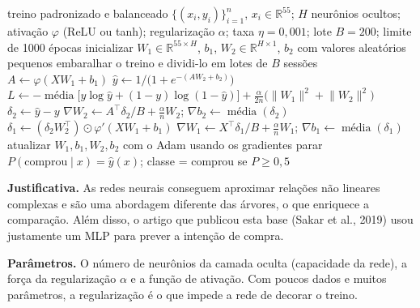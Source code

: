 \documentclass[11pt,a4paper]{article}
\begin{document}
\begin{algorithm}[H]
  \caption{Treino do MLP com uma camada oculta}
  \label{alg:mlp}
  \small
  \begin{algorithmic}[1]
    \Require treino padronizado e balanceado $\{(x_i, y_i)\}_{i=1}^{n}$, $x_i \in \mathbb{R}^{55}$; $H$ neurônios
             ocultos; ativação $\varphi$ (ReLU ou tanh); regularização $\alpha$; taxa $\eta = 0{,}001$; lote
             $B = 200$; limite de 1000 épocas
    \State inicializar $W_1 \in \mathbb{R}^{55 \times H}$, $b_1$, $W_2 \in \mathbb{R}^{H \times 1}$, $b_2$ com
           valores aleatórios pequenos
      \State embaralhar o treino e dividi-lo em lotes de $B$ sessões
        \State $A \gets \varphi(X W_1 + b_1)$ 
        \State $\hat{y} \gets 1 / \big(1 + e^{-(A W_2 + b_2)}\big)$ 
        \State $L \gets -\operatorname{média}\big[y \log \hat{y} + (1-y)\log(1-\hat{y})\big] +
               \frac{\alpha}{2n}\big(\lVert W_1\rVert^2 + \lVert W_2\rVert^2\big)$
        \State $\delta_2 \gets \hat{y} - y$ 
        \State $\nabla W_2 \gets A^{\top}\delta_2 / B + \frac{\alpha}{n} W_2$; \quad
               $\nabla b_2 \gets \operatorname{média}(\delta_2)$
        \State $\delta_1 \gets (\delta_2 W_2^{\top}) \odot \varphi'(X W_1 + b_1)$ 
        \State $\nabla W_1 \gets X^{\top}\delta_1 / B + \frac{\alpha}{n} W_1$; \quad
               $\nabla b_1 \gets \operatorname{média}(\delta_1)$
        \State atualizar $W_1, b_1, W_2, b_2$ com o Adam usando os gradientes
      \EndFor
        \State parar
      \EndIf
    \EndFor
    \Ensure $P(\text{comprou} \mid x) = \hat{y}(x)$; classe = comprou se $P \ge 0{,}5$
  \end{algorithmic}
\end{algorithm}

\textbf{Justificativa.} As redes neurais conseguem aproximar relações não lineares complexas e são uma abordagem
diferente das árvores, o que enriquece a comparação. Além disso, o artigo que publicou esta base (Sakar et al., 2019)
usou justamente um MLP para prever a intenção de compra.

\textbf{Parâmetros.} O número de neurônios da camada oculta (capacidade da rede), a força da regularização $\alpha$ e
a função de ativação. Com poucos dados e muitos parâmetros, a regularização é o que impede a rede de decorar o treino.
\end{document}
